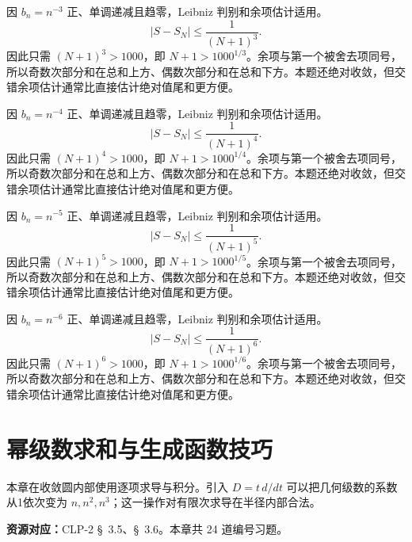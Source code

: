 \documentclass[UTF8,12pt,a4paper,fontset=fandol]{ctexart}
\begin{document}
\begin{solve}\label{ans:c26q22}
因 $b_n=n^{-3}$ 正、单调递减且趋零，Leibniz 判别和余项估计适用。
\[
|S-S_N|\le\frac1{(N+1)^{3}}.
\]
因此只需 $(N+1)^{3}>1000$，即 $N+1>1000^{1/3}$。余项与第一个被舍去项同号，所以奇数次部分和在总和上方、偶数次部分和在总和下方。本题还绝对收敛，但交错余项估计通常比直接估计绝对值尾和更方便。
\end{solve}

\begin{solve}\label{ans:c26q23}
因 $b_n=n^{-4}$ 正、单调递减且趋零，Leibniz 判别和余项估计适用。
\[
|S-S_N|\le\frac1{(N+1)^{4}}.
\]
因此只需 $(N+1)^{4}>1000$，即 $N+1>1000^{1/4}$。余项与第一个被舍去项同号，所以奇数次部分和在总和上方、偶数次部分和在总和下方。本题还绝对收敛，但交错余项估计通常比直接估计绝对值尾和更方便。
\end{solve}

\begin{solve}\label{ans:c26q24}
因 $b_n=n^{-5}$ 正、单调递减且趋零，Leibniz 判别和余项估计适用。
\[
|S-S_N|\le\frac1{(N+1)^{5}}.
\]
因此只需 $(N+1)^{5}>1000$，即 $N+1>1000^{1/5}$。余项与第一个被舍去项同号，所以奇数次部分和在总和上方、偶数次部分和在总和下方。本题还绝对收敛，但交错余项估计通常比直接估计绝对值尾和更方便。
\end{solve}

\begin{solve}\label{ans:c26q25}
因 $b_n=n^{-6}$ 正、单调递减且趋零，Leibniz 判别和余项估计适用。
\[
|S-S_N|\le\frac1{(N+1)^{6}}.
\]
因此只需 $(N+1)^{6}>1000$，即 $N+1>1000^{1/6}$。余项与第一个被舍去项同号，所以奇数次部分和在总和上方、偶数次部分和在总和下方。本题还绝对收敛，但交错余项估计通常比直接估计绝对值尾和更方便。
\end{solve}

\clearpage
\section{幂级数求和与生成函数技巧}\label{sec:ch27}
本章在收敛圆内部使用逐项求导与积分。引入 $D=t\,d/dt$ 可以把几何级数的系数从1依次变为 $n,n^2,n^3$；这一操作对有限次求导在半径内部合法。

\textbf{资源对应：}CLP-2 \S~3.5、\S~3.6。本章共 24 道编号习题。
\end{document}
